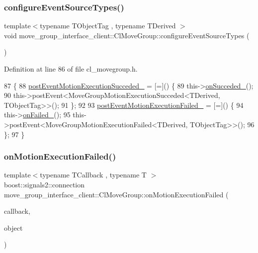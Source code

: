 \subsubsection{\texorpdfstring{configure\+Event\+Source\+Types()}{configureEventSourceTypes()}}
{\footnotesize\ttfamily template$<$typename T\+Object\+Tag , typename T\+Derived $>$ \\
void move\+\_\+group\+\_\+interface\+\_\+client\+::\+Cl\+Move\+Group\+::configure\+Event\+Source\+Types (\begin{DoxyParamCaption}{ }\end{DoxyParamCaption})\hspace{0.3cm}{\ttfamily [inline]}}



Definition at line 86 of file cl\+\_\+movegroup.\+h.


\begin{DoxyCode}
87   \{
88     \hyperlink{classmove__group__interface__client_1_1ClMoveGroup_a76aa1b70c574348aa734f727fd5ef373}{postEventMotionExecutionSucceded\_} = [=]() \{
89       this->\hyperlink{classmove__group__interface__client_1_1ClMoveGroup_ac82aa6c44468e8035ff5df6d74746b88}{onSucceded\_}();
90       this->postEvent<MoveGroupMotionExecutionSucceded<TDerived, TObjectTag>>();
91     \};
92 
93     \hyperlink{classmove__group__interface__client_1_1ClMoveGroup_a261f73d036417b5374d08a1e89325eed}{postEventMotionExecutionFailed\_} = [=]() \{
94       this->\hyperlink{classmove__group__interface__client_1_1ClMoveGroup_a793ac2c50a1d897afe14a8780940e8ce}{onFailed\_}();
95       this->postEvent<MoveGroupMotionExecutionFailed<TDerived, TObjectTag>>();
96     \};
97   \}
\end{DoxyCode}
\mbox{\label{classmove__group__interface__client_1_1ClMoveGroup_a0729ef7e1ea6500f449ccdc2c3b0e3ec}} 
\subsubsection{\texorpdfstring{on\+Motion\+Execution\+Failed()}{onMotionExecutionFailed()}}
{\footnotesize\ttfamily template$<$typename T\+Callback , typename T $>$ \\
boost\+::signals2\+::connection move\+\_\+group\+\_\+interface\+\_\+client\+::\+Cl\+Move\+Group\+::on\+Motion\+Execution\+Failed (\begin{DoxyParamCaption}\item[{T\+Callback}]{callback,  }\item[{T $\ast$}]{object }\end{DoxyParamCaption})\hspace{0.3cm}{\ttfamily [inline]}}



